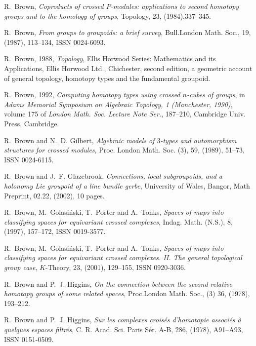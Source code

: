 \documentclass[12pt]{article}
\theoremstyle{definition}
\theoremstyle{remark}
\numberwithin{equation}{subsection}
\begin{document}
\begin{thebibliography}{99}
R.~Brown, {\em Coproducts of crossed {$P$}-modules: applications
to second homotopy groups and to the homology of groups}, Topology, 23, (1984),337--345.

R.~Brown, {\em From groups to groupoids: a brief survey}, Bull.London Math.  Soc., 19, (1987), 113--134, ISSN 0024-6093.

R.~Brown, 1988, {\em Topology}, Ellis Horwood Series:
Mathematics and its Applications, Ellis Horwood Ltd., Chichester, second edition, a geometric %
account of general topology, homotopy types and the fundamental groupoid.

R.~Brown, 1992, {\em Computing homotopy types using crossed
{$n$}-cubes of  groups}, in {\em Adams Memorial Symposium on Algebraic Topology, 1
  (Manchester, 1990)}, volume 175 of {\em London Math. Soc. Lecture Note
  Ser.\/},  187--210, Cambridge Univ. Press, Cambridge.

R.~Brown and N.~D. Gilbert, {\em Algebraic models of {$3$}-types and automorphism structures for crossed modules}, Proc. London Math. Soc. (3),  59, (1989), 51--73, ISSN 0024-6115.

R.~Brown and J.~F. Glazebrook, {\em Connections, local subgroupoids, and a   holonomy Lie groupoid of a line bundle gerbe}, University of Wales, Bangor,   Math Preprint, 02.22, (2002), 10 pages.

R.~Brown, M.~Golasi{\'n}ski, T.~Porter and A.~Tonks, {\em Spaces
of maps into classifying spaces for equivariant crossed complexes}, Indag. Math. (N.S.),
  8, (1997), 157--172, ISSN 0019-3577.

R.~Brown, M.~Golasi{\'n}ski, T.~Porter and A.~Tonks, {\em Spaces
of maps into classifying spaces for equivariant crossed complexes. {II}. {T}he general %
topological group case}, $K$-Theory, 23, (2001), 129--155, ISSN 0920-3036.

R.~Brown and P.~J. Higgins, {\em On the connection between the
second relative homotopy groups of some related spaces\/}, Proc.London Math. Soc., (3) 36, %
(1978), 193--212.

R.~Brown and P.~J. Higgins, {\em Sur les complexes crois\'es
d'homotopie associ\'es \`a quelques espaces filtr\'es}, C. R. Acad. Sci. Paris S\'er. A-B, %
286, (1978), A91--A93, ISSN 0151-0509.



\end{thebibliography}
\end{document}
